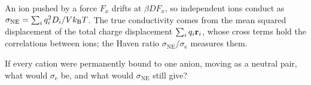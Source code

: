 \begin{keyidea}
An ion pushed by a force $F_x$ drifts at $\beta DF_x$, so independent ions
conduct as $\sigma_{\mathrm{NE}} = \sum_iq_i^2D_i/Vk_{\mathrm{B}} T$. The true
conductivity comes from the mean squared displacement of the total charge
displacement $\sum_iq_i\bm{\mathrm{r}}_i$, whose cross terms hold the correlations
between ions; the Haven ratio $\sigma_{\mathrm{NE}}/\sigma_{\mathrm e}$
measures them.
\end{keyidea}


\begin{selfcheck}
If every cation were permanently bound to one anion, moving as a neutral
pair, what would $\sigma_{\mathrm e}$ be, and what would
$\sigma_{\mathrm{NE}}$ still give?
\end{selfcheck}
